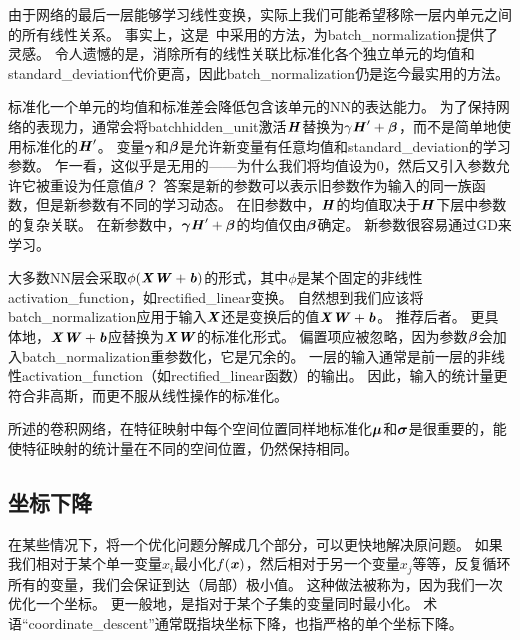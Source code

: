 由于网络的最后一层能够学习线性变换，实际上我们可能希望移除一层内单元之间的所有线性关系。
事实上，这是~\cite{Desjardins2015}中采用的方法，为\gls{batch_normalization}提供了灵感。
令人遗憾的是，消除所有的线性关联比标准化各个独立单元的均值和\gls{standard_deviation}代价更高，因此\gls{batch_normalization}仍是迄今最实用的方法。


标准化一个单元的均值和标准差会降低包含该单元的\gls{NN}的表达能力。
为了保持网络的表现力，通常会将\gls{batch}\gls{hidden_unit}激活$\boldsymbol{\mathit{H}}$替换为$\gamma \boldsymbol{\mathit{H}}' + \boldsymbol{\beta}$，而不是简单地使用标准化的$\boldsymbol{\mathit{H}}'$。
变量$\boldsymbol{\gamma}$和$\boldsymbol{\beta}$是允许新变量有任意均值和\gls{standard_deviation}的学习参数。
乍一看，这似乎是无用的——为什么我们将均值设为$0$，然后又引入参数允许它被重设为任意值$\boldsymbol{\beta}$？
答案是新的参数可以表示旧参数作为输入的同一族函数，但是新参数有不同的学习动态。
在旧参数中，$\boldsymbol{\mathit{H}}$的均值取决于$\boldsymbol{\mathit{H}}$下层中参数的复杂关联。
在新参数中，$\boldsymbol{\gamma} \boldsymbol{\mathit{H}}' + \boldsymbol{\beta}$的均值仅由$\boldsymbol{\beta}$确定。
新参数很容易通过\gls{GD}来学习。

大多数\gls{NN}层会采取$\phi(\boldsymbol{\mathit{X}}\boldsymbol{\mathit{W}}+ \boldsymbol{\mathit{b}})$的形式，其中$\phi$是某个固定的非线性\gls{activation_function}，如\gls{rectified_linear}变换。
自然想到我们应该将\gls{batch_normalization}应用于输入$\boldsymbol{\mathit{X}}$还是变换后的值$\boldsymbol{\mathit{X}}\boldsymbol{\mathit{W}}+\boldsymbol{\mathit{b}}$。
\cite{Ioffe+Szegedy-2015}推荐后者。
更具体地，$\boldsymbol{\mathit{X}}\boldsymbol{\mathit{W}}+\boldsymbol{\mathit{b}}$应替换为$\boldsymbol{\mathit{X}}\boldsymbol{\mathit{W}}$的标准化形式。
偏置项应被忽略，因为参数$\boldsymbol{\beta}$会加入\gls{batch_normalization}重参数化，它是冗余的。
一层的输入通常是前一层的非线性\gls{activation_function}（如\gls{rectified_linear}函数）的输出。
因此，输入的统计量更符合非高斯，而更不服从线性操作的标准化。

所述的卷积网络，在特征映射中每个空间位置同样地标准化$\boldsymbol{\mu}$和$\boldsymbol{\sigma}$是很重要的，能使特征映射的统计量在不同的空间位置，仍然保持相同。

\subsection{坐标下降}
\label{sec:coordinate_descent}
在某些情况下，将一个优化问题分解成几个部分，可以更快地解决原问题。
如果我们相对于某个单一变量$x_i$最小化$f(\boldsymbol{\mathit{x}})$，然后相对于另一个变量$x_j$等等，反复循环所有的变量，我们会保证到达（局部）极小值。
这种做法被称为，因为我们一次优化一个坐标。
更一般地，是指对于某个子集的变量同时最小化。
术语``\gls{coordinate_descent}''通常既指块坐标下降，也指严格的单个坐标下降。



